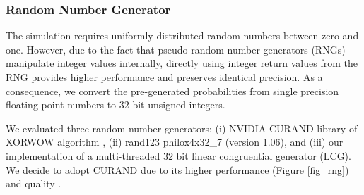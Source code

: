 \subsubsection{Random Number Generator}

\label{section_rng}

The simulation requires uniformly distributed random numbers between
zero and one. However, due to the fact that pseudo random number
generators (RNGs) manipulate integer values internally, directly using integer
return values from the RNG provides higher performance and preserves identical
precision.  As a consequence, we convert the pre-generated
probabilities from single precision floating point numbers to 32 bit
unsigned integers.

We evaluated three random number generators: (i) NVIDIA CURAND library
of XORWOW algorithm \cite{curand}, (ii) rand123
\cite{Salmon:2011:PRN:2063384.2063405} philox4x32\_7 (version 1.06),
and (iii) our implementation of a multi-threaded 32 bit linear
congruential generator (LCG).  We decide to adopt CURAND due to its
higher performance (Figure \ref{fig_rng}) and quality
\cite{2012arXiv1204.6193M}.


